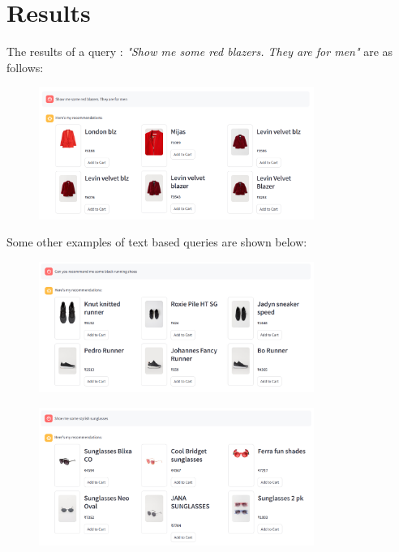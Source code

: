 \chapter{Results}
\label{chap:results}

The results of a query : \textit{"Show me some red blazers. They are for men"} are as follows:

\begin{figure}[H]
\centering
    \includegraphics[width=0.8\textwidth]{images/text_srch.png}
\end{figure}

Some other examples of text based queries are shown below:

\begin{figure}[H]
\centering
    \includegraphics[width=0.8\textwidth]{images/text_srch2.png}
\end{figure}

\begin{figure}[H]
\centering
    \includegraphics[width=0.8\textwidth]{images/text_srch3.png}
\end{figure}

